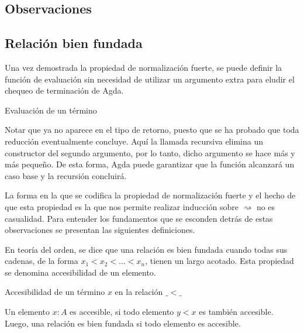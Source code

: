 

\subsection{Observaciones}

\subsection{Relación bien fundada}

Una vez demostrada la propiedad de normalización fuerte, se puede definir la función de evaluación sin necesidad de utilizar un argumento extra para eludir el chequeo de terminación de Agda.

\begin{codigo}
	Evaluación de un término
\end{codigo}

Notar que ya no aparece  en el tipo de retorno, puesto que se ha probado que toda reducción eventualmente concluye.
Aquí la llamada recursiva elimina un constructor  del segundo argumento, por lo tanto, dicho argumento se hace más y más pequeño.
De esta forma, Agda puede garantizar que la función alcanzará un caso base y la recursión concluirá.

La forma en la que se codifica la propiedad de normalización fuerte y el hecho de que esta propiedad es la que nos permite realizar inducción sobre $\rightsquigarrow$ no es casualidad.
Para entender los fundamentos que se esconden detrás de estas observaciones se presentan las siguientes definiciones.

En teoría del orden, se dice que una relación es bien fundada cuando todas sus cadenas, de la forma $x_1 < x_2 < \dots < x_n$, tienen un largo acotado.
Esta propiedad se denomina accesibilidad de un elemento.

\begin{codigo}
	Accesibilidad de un término $x$ en la relación $\_<\_$
\end{codigo}

Un elemento $x: A$ es accesible, si todo elemento $y < x$ es también accesible.
Luego, una relación es bien fundada si todo elemento es accesible.

